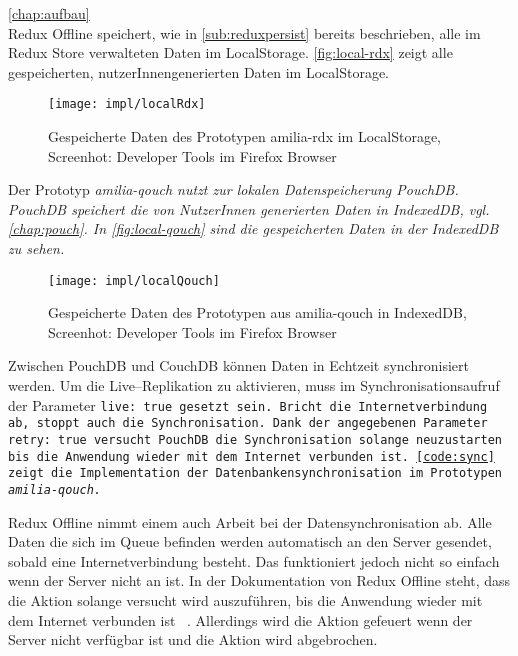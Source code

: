 %
%
\autoref{chap:aufbau}\\
Redux Offline speichert, wie in \autoref{sub:reduxpersist} bereits beschrieben, alle im Redux Store verwalteten Daten im LocalStorage. \autoref{fig:local-rdx} zeigt alle gespeicherten, nutzerInnengenerierten Daten im LocalStorage.
%
\begin{figure}[H]
  \centering
  \texttt{[image: impl/localRdx]}
  \grayRule
  \caption[Gespeicherte Daten im LocalStorage]{Gespeicherte Daten des Prototypen amilia-rdx im LocalStorage,\\Screenhot: Developer Tools im Firefox Browser}
  \label{fig:local-rdx}
\end{figure}
% 
Der Prototyp \it{amilia-qouch} nutzt zur lokalen Datenspeicherung PouchDB. PouchDB speichert die von NutzerInnen generierten Daten in IndexedDB, vgl. \autoref{chap:pouch}. In \autoref{fig:local-qouch} sind die gespeicherten Daten in der IndexedDB zu sehen.
%
\begin{figure}[H]
  \centering
  \texttt{[image: impl/localQouch]}
  \grayRule
  \caption[Gespeicherte Daten in IndexedDB]{Gespeicherte Daten des Prototypen aus amilia-qouch in IndexedDB,\\Screenhot: Developer Tools im Firefox Browser}
  \label{fig:local-qouch}
\end{figure}
%
%
Zwischen PouchDB und CouchDB können Daten in Echtzeit synchronisiert werden. Um die Live--Replikation zu aktivieren, muss im Synchronisationsaufruf der Parameter \tt{live: true} gesetzt sein.
Bricht die Internetverbindung ab, stoppt auch die Synchronisation.
Dank der angegebenen Parameter \tt{retry: true} versucht PouchDB die Synchronisation solange neuzustarten bis die Anwendung wieder mit dem Internet verbunden ist. \autoref{code:sync} zeigt die Implementation der Datenbankensynchronisation im Prototypen \it{amilia-qouch}.
%
\begin{center}
  
\end{center}
Redux Offline nimmt einem auch Arbeit bei der Datensynchronisation ab. Alle Daten die sich im Queue befinden werden automatisch an den Server gesendet, sobald eine Internetverbindung besteht. Das funktioniert jedoch nicht so einfach wenn der Server nicht an ist. In der Dokumentation von Redux Offline steht, dass die Aktion solange versucht wird auszuführen, bis die Anwendung wieder mit dem Internet verbunden ist ~\cite{giving-up}. Allerdings wird die  Aktion gefeuert wenn der Server nicht verfügbar ist und die Aktion wird abgebrochen.
